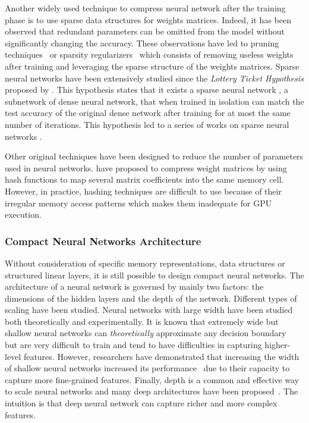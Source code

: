 Another widely used technique to compress neural network after the training phase is to use sparse data structures for weights matrices.
Indeed, it has been observed that redundant parameters can be omitted from the model without significantly changing the accuracy.
These observations have led to pruning techniques~\cite{dai2018compressing,han2015deep,lin2017runtime} or sparsity regularizers~\cite{collins2014memory,dai2018compressing,liu2015sparse} which consists of removing useless weights after training and leveraging the sparse structure of the weights matrices.
Sparse neural networks have been extensively studied since the \emph{Lottery Ticket Hypothesis} proposed by \citet{frankle2018lottery}.
This hypothesis states that it exists a sparse neural network \ie, a subnetwork of dense neural network, that when trained in isolation can match the test accuracy of the original dense network after training for at most the same number of iterations.
This hypothesis led to a series of works on sparse neural networks \cite{zhou2019deconstructing,malach2019proving,evci2020rigging}.

Other original techniques have been designed to reduce the number of parameters used in neural networks. 
\citet{chen2015compressing} have proposed to compress weight matrices by using hash functions to map several matrix coefficients into the same memory cell.
However, in practice, hashing techniques are difficult to use because of their irregular memory access patterns which makes them inadequate for GPU execution.


\subsubsection{Compact Neural Networks Architecture}

Without consideration of specific memory representations, data structures or structured linear layers, it is still possible to design compact neural networks.
The architecture of a neural network is governed by mainly two factors: the dimensions of the hidden layers and the depth of the network.
Different types of scaling have been studied.
Neural networks with large width have been studied both theoretically and experimentally.
It is known that extremely wide but shallow neural networks can \emph{theoretically} approximate any decision boundary~\cite{cybenko1989approximation} but are very difficult to train and tend to have difficulties in capturing higher-level features. 
However, researchers have demonstrated that increasing the width of shallow neural networks increased its performance~\cite{howard2017mobilenets,sandler2018mobilenetv2,tan2019mnasnet,zagoruyko2016wide} due to their capacity to capture more fine-grained features. 
Finally, depth is a common and effective way to scale neural networks and many deep architectures have been proposed~\cite{he2016deep, huang2016deep, szegedy2016rethinking,szegedy2017inception,xiao2018dynamical}. 
The intuition is that deep neural network can capture richer and more complex features.

